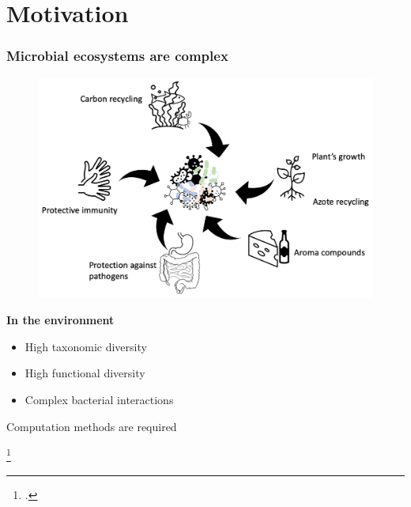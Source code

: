 \documentclass[8pt,usenames,dvipsnames]{beamer}
\begin{document}
\section{Motivation}
\begin{frame}
\frametitle{Microbial ecosystems are complex}
\begin{minipage}{0.6\textwidth}
\begin{figure}
\includegraphics[width=\textwidth]{figures/bacterial-env.pdf}
\end{figure}
\end{minipage}%
\begin{minipage}{0.4\textwidth}
\textbf{In the environment}
\begin{itemize}
\item High taxonomic diversity  \\

\item High functional diversity \\

\item Complex bacterial interactions
\end{itemize}

\end{minipage}
\begin{alertblock}{}
\centering
Computation methods are required
\end{alertblock}

 \tiny\footcite*{10.1093/chemse/bjh067,BELKAID2014121,Zhang2015,Hoorman2011,McSweeney2000}
\end{frame}
\end{document}

